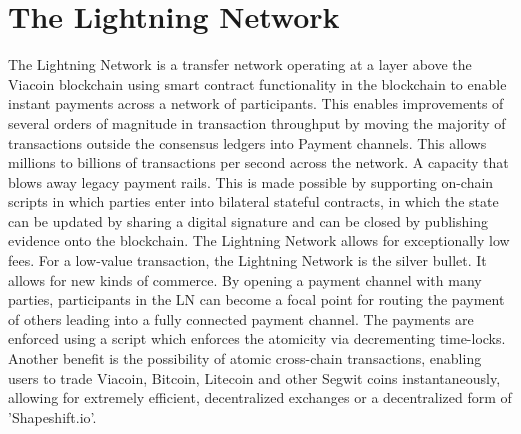 \documentclass{article}
\begin{document}
\section{The Lightning Network}\label{sec: The Lightning Network}
\cite{lightningNetwork}The Lightning Network is a transfer network operating at a layer above the
Viacoin blockchain using smart contract functionality in the blockchain to enable instant payments across a network of participants. 
This enables improvements of several orders of magnitude in
transaction throughput by moving the majority of transactions outside the
consensus ledgers into Payment channels. This allows millions to billions of transactions per second across the network.
A capacity that blows away legacy payment rails.
This is made possible by supporting on-chain scripts in which parties enter into bilateral stateful contracts, in which the state
can be updated by sharing a digital signature and can be closed by publishing
evidence onto the blockchain.
\newline \newline \noindent
The Lightning Network allows for exceptionally low fees. For a low-value transaction, the Lightning Network
is the silver bullet. It allows for new kinds of commerce.
By opening a payment channel with many parties, participants in the LN can
become a focal point for routing the payment of others leading into a fully
connected payment channel. The payments are enforced using a script which enforces the atomicity via decrementing time-locks.
\newline \newline \noindent
Another benefit is the possibility of atomic cross-chain transactions, enabling users to trade Viacoin, Bitcoin, Litecoin and other Segwit coins
instantaneously, allowing for extremely efficient, decentralized exchanges or a decentralized form of 'Shapeshift.io'.
\newpage
\end{document}
